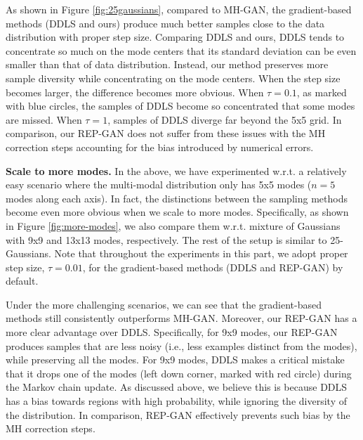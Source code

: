 \documentclass{article} %
\newcommand{\<}{\left\langle}
\renewcommand{\>}{\right\rangle}
\begin{document}
As shown in Figure \ref{fig:25gaussians}, compared to MH-GAN, the gradient-based methods (DDLS and ours) produce much better samples close to the data distribution with proper step size. Comparing DDLS and ours, DDLS tends to concentrate so much on the mode centers that its standard deviation can be even smaller than that of data distribution. Instead, our method preserves more sample diversity while concentrating on the mode centers. 
When the step size becomes larger, the difference becomes more obvious. When $\tau=0.1$, as marked with blue circles, the samples of DDLS become so concentrated that some modes are missed. When $\tau=1$, samples of DDLS diverge far beyond the 5x5 grid. In comparison, our REP-GAN does not suffer from these issues with the MH correction steps accounting for the bias introduced by numerical errors.


\textbf{Scale to more modes.} In the above, we have experimented w.r.t. a relatively easy scenario where the multi-modal distribution only has 5x5 modes ($n=5$ modes along each axis). In fact, the distinctions between the sampling methods become even more obvious when we scale to more modes. Specifically, as shown in Figure \ref{fig:more-modes}, we also compare them w.r.t. mixture of Gaussians with 9x9 and 13x13 modes, respectively. The rest of the setup is similar to 25-Gaussians. Note that throughout the experiments in this part, we adopt proper step size, $\tau=0.01$, for the gradient-based methods (DDLS and REP-GAN) by default.

Under the more challenging scenarios, we can see that the gradient-based methods still consistently outperforms MH-GAN. Moreover, our REP-GAN has a more clear advantage over DDLS. Specifically, for 9x9 modes, our REP-GAN produces samples that are less noisy (i.e., less examples distinct from the modes), while preserving all the modes. For 9x9 modes, DDLS makes a critical mistake that it drops one of the modes (left down corner, marked with red circle) during the Markov chain update. 
As discussed above, we believe this is because DDLS has a bias towards regions with high probability, while ignoring the diversity of the distribution. In comparison, REP-GAN effectively prevents such bias by the MH correction steps.


\end{document}
